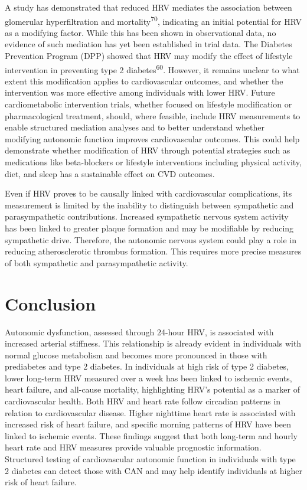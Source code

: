 \documentclass[
  a4paper,
  headsepline=true,
  open=any]{scrbook}
\begin{document}
A study has demonstrated that reduced HRV mediates the association
between glomerular hyperfiltration and mortality\textsuperscript{70},
indicating an initial potential for HRV as a modifying factor. While
this has been shown in observational data, no evidence of such mediation
has yet been established in trial data. The Diabetes Prevention Program
(DPP) showed that HRV may modify the effect of lifestyle intervention in
preventing type 2 diabetes\textsuperscript{60}. However, it remains
unclear to what extent this modification applies to cardiovascular
outcomes, and whether the intervention was more effective among
individuals with lower HRV. Future cardiometabolic intervention trials,
whether focused on lifestyle modification or pharmacological treatment,
should, where feasible, include HRV measurements to enable structured
mediation analyses and to better understand whether modifying autonomic
function improves cardiovascular outcomes. This could help demonstrate
whether modification of HRV through potential strategies such as
medications like beta-blockers or lifestyle interventions including
physical activity, diet, and sleep has a sustainable effect on CVD
outcomes.

Even if HRV proves to be causally linked with cardiovascular
complications, its measurement is limited by the inability to
distinguish between sympathetic and parasympathetic contributions.
Increased sympathetic nervous system activity has been linked to greater
plaque formation and may be modifiable by reducing sympathetic drive.
Therefore, the autonomic nervous system could play a role in reducing
atherosclerotic thrombus formation. This requires more precise measures
of both sympathetic and parasympathetic activity.


\hypertarget{conclusion}{%
\chapter{Conclusion}\label{conclusion}}

Autonomic dysfunction, assessed through 24-hour HRV, is associated with
increased arterial stiffness. This relationship is already evident in
individuals with normal glucose metabolism and becomes more pronounced
in those with prediabetes and type 2 diabetes. In individuals at high
risk of type 2 diabetes, lower long-term HRV measured over a week has
been linked to ischemic events, heart failure, and all-cause mortality,
highlighting HRV's potential as a marker of cardiovascular health. Both
HRV and heart rate follow circadian patterns in relation to
cardiovascular disease. Higher nighttime heart rate is associated with
increased risk of heart failure, and specific morning patterns of HRV
have been linked to ischemic events. These findings suggest that both
long-term and hourly heart rate and HRV measures provide valuable
prognostic information. Structured testing of cardiovascular autonomic
function in individuals with type 2 diabetes can detect those with CAN
and may help identify individuals at higher risk of heart failure.
\end{document}

